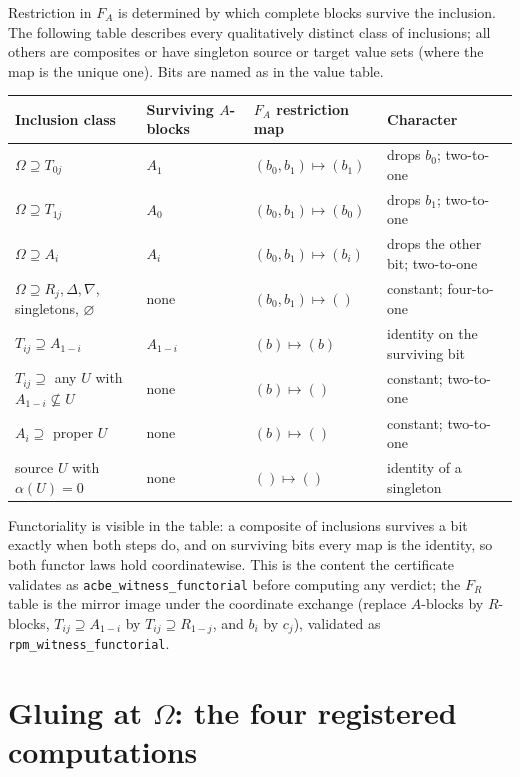 Restriction in $F_A$ is determined by which complete blocks survive the
inclusion. The following table describes every qualitatively distinct
class of inclusions; all others are composites or have singleton source
or target value sets (where the map is the unique one). Bits are named
as in the value table.

\begingroup\small
\begin{longtable}{@{}>{\raggedright\arraybackslash}p{}
  >{\raggedright\arraybackslash}p{}
  >{\raggedright\arraybackslash}p{}
  >{\raggedright\arraybackslash}p{}@{}}
\toprule
Inclusion class & Surviving $A$-blocks & $F_A$ restriction map &
Character \\
\midrule
\endhead
\bottomrule
\endfoot
$\Omega \supseteq T_{0j}$ & $A_1$ &
$(b_0, b_1) \mapsto (b_1)$ & drops $b_0$; two-to-one \\
$\Omega \supseteq T_{1j}$ & $A_0$ &
$(b_0, b_1) \mapsto (b_0)$ & drops $b_1$; two-to-one \\
$\Omega \supseteq A_i$ & $A_i$ &
$(b_0, b_1) \mapsto (b_i)$ & drops the other bit; two-to-one \\
$\Omega \supseteq R_j, \Delta, \nabla$, singletons, $\varnothing$ &
none & $(b_0, b_1) \mapsto ()$ & constant; four-to-one \\
$T_{ij} \supseteq A_{1-i}$ & $A_{1-i}$ &
$(b) \mapsto (b)$ & identity on the surviving bit \\
$T_{ij} \supseteq$ any $U$ with $A_{1-i} \not\subseteq U$ & none &
$(b) \mapsto ()$ & constant; two-to-one \\
$A_i \supseteq$ proper $U$ & none &
$(b) \mapsto ()$ & constant; two-to-one \\
source $U$ with $\alpha(U) = 0$ & none & $() \mapsto ()$ & identity of a
singleton \\
\end{longtable}
\endgroup

Functoriality is visible in the table: a composite of inclusions
survives a bit exactly when both steps do, and on surviving bits every
map is the identity, so both functor laws hold coordinatewise. This is
the content the certificate validates as
\texttt{acbe\_witness\_functorial} before computing any verdict; the
$F_R$ table is the mirror image under the coordinate exchange (replace
$A$-blocks by $R$-blocks, $T_{ij} \supseteq A_{1-i}$ by
$T_{ij} \supseteq R_{1-j}$, and $b_i$ by $c_j$), validated as
\texttt{rpm\_witness\_functorial}.

\section{Gluing at $\Omega$: the four registered computations}
\label{appC:sec:gluing}


